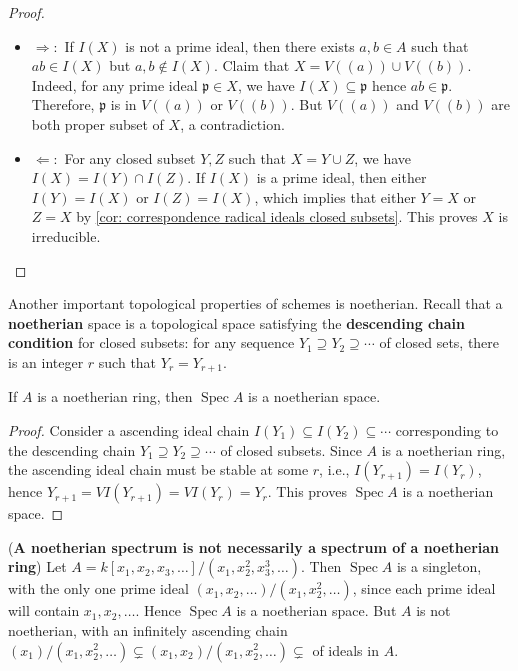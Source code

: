 \documentclass[11pt]{article}
\newcommand{\Spec}{\operatorname{Spec}}
\begin{document}
\begin{proof}
    \begin{itemize}
        \item $ \Rightarrow: $ If $ I(X) $ is not a prime ideal, then there exists $ a,b \in A $ 
        such that $ ab \in I(X) $ but $ a,b \notin I(X) $. Claim that $ X = V((a))\cup V((b)) $. 
        Indeed, for any prime ideal $ \mathfrak{p} \in X $, we have $ I(X) \subseteq \mathfrak{p} $ 
        hence $ ab \in \mathfrak{p} $. Therefore, $ \mathfrak{p} $ is in $ V((a)) $ or $ V((b)) $. 
        But $ V((a)) $ and $ V((b)) $ are both proper subset of $ X $, a contradiction. 

        \item $ \Leftarrow: $ For any closed subset $ Y,Z $ such that 
        $ X = Y \cup Z $, we have $ I(X)=I(Y) \cap I(Z) $. If $ I(X) $ is a prime ideal, then 
        either $ I(Y)=I(X) $ or $ I(Z)=I(X) $, which implies that either $ Y = X$ or $ Z = X $ 
        by \autoref{cor: correspondence radical ideals closed subsets}. This proves $ X $ is irreducible. 
    \end{itemize}
\end{proof}

Another important topological properties of schemes is noetherian. 
Recall that a \textbf{noetherian} space is a topological space satisfying the \textbf{descending chain condition} 
for closed subsets: for any sequence $ Y_{1} \supseteq Y_{2} \supseteq \cdots $ of closed sets, 
there is an integer $ r $ such that $ Y_{r}=Y_{r+1} $. 

\begin{lemma}
    \cite[Exercise 3.6.T]{vakilTheRisingSea} 
    If $ A $ is a noetherian ring, then $ \Spec A $ is a noetherian space. 
\end{lemma}

\begin{proof}
    Consider a ascending ideal chain $ I(Y_{1}) \subseteq I(Y_{2}) \subseteq \cdots $ 
    corresponding to the descending chain $ Y_{1} \supseteq Y_{2} \supseteq \cdots $ 
    of closed subsets. 
    Since $ A $ is a noetherian ring, the ascending ideal chain must be stable at some $ r $, 
    i.e., $ I(Y_{r+1})=I(Y_{r}) $, hence $ Y_{r+1}=VI(Y_{r+1})=VI(Y_{r})=Y_{r} $. 
    This proves $ \Spec A $ is a noetherian space. 
\end{proof}

\begin{example}(\textbf{A noetherian spectrum is not necessarily a spectrum of a noetherian ring})
    \cite[Exercise 3.6.T]{vakilTheRisingSea} 
    Let $ A = k[x_{1},x_{2},x_{3},\dots] / (x_{1},x_{2}^{2},x_{3}^{3},\dots) $. 
    Then $ \Spec A $ is a singleton, with the only one prime ideal 
    $ (x_{1},x_{2},\dots)/ (x_{1},x_{2}^{2},\dots) $, since each prime ideal will contain $ x_{1},x_{2},\dots $. 
    Hence $ \Spec A $ is a noetherian space. 
    But $ A $ is not noetherian, with an infinitely ascending chain 
    $ (x_{1})/ (x_{1},x_{2}^{2},\dots) \subsetneq (x_{1},x_{2})/ (x_{1},x_{2}^{2},\dots) \subsetneq $ of ideals in $ A $. 
\end{example}
\end{document}
